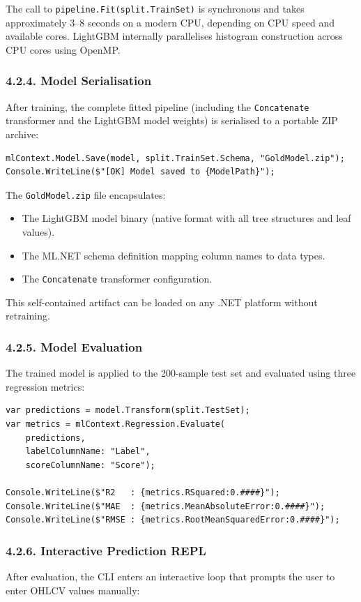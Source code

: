 The call to \texttt{pipeline.Fit(split.TrainSet)} is synchronous and takes approximately 3--8 seconds on a modern CPU, depending on CPU speed and available cores. LightGBM internally parallelises histogram construction across CPU cores using OpenMP.

\subsubsection{4.2.4. Model Serialisation}
After training, the complete fitted pipeline (including the \texttt{Concatenate} transformer and the LightGBM model weights) is serialised to a portable ZIP archive:

\begin{lstlisting}
mlContext.Model.Save(model, split.TrainSet.Schema, "GoldModel.zip");
Console.WriteLine($"[OK] Model saved to {ModelPath}");
\end{lstlisting}

The \texttt{GoldModel.zip} file encapsulates:
\begin{itemize}
  \item The LightGBM model binary (native format with all tree structures and leaf values).
  \item The ML.NET schema definition mapping column names to data types.
  \item The \texttt{Concatenate} transformer configuration.
\end{itemize}

This self-contained artifact can be loaded on any .NET platform without retraining.

\subsubsection{4.2.5. Model Evaluation}
The trained model is applied to the 200-sample test set and evaluated using three regression metrics:

\begin{lstlisting}
var predictions = model.Transform(split.TestSet);
var metrics = mlContext.Regression.Evaluate(
    predictions,
    labelColumnName: "Label",
    scoreColumnName: "Score");

Console.WriteLine($"R2   : {metrics.RSquared:0.####}");
Console.WriteLine($"MAE  : {metrics.MeanAbsoluteError:0.####}");
Console.WriteLine($"RMSE : {metrics.RootMeanSquaredError:0.####}");
\end{lstlisting}

\subsubsection{4.2.6. Interactive Prediction REPL}
After evaluation, the CLI enters an interactive loop that prompts the user to enter OHLCV values manually:

